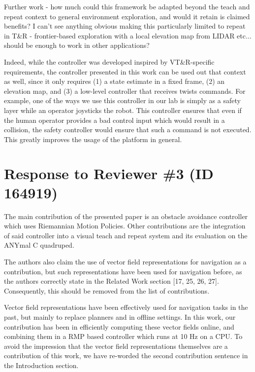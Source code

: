 \documentclass[a4paper,11pt]{article}
\begin{document}
\begin{displayquote}
	Further work - how much could this framework be adapted beyond the
	teach and repeat context to general environment exploration, and would
	it retain is claimed benefits? I can't see anything obvious making this
	particularly limited to repeat in T\&R - frontier-based exploration with
	a local elevation map from LIDAR etc... should be enough to work in
	other applications?
\end{displayquote}

\begin{outline}[enumerate]
	\1 Indeed, while the controller was developed inspired by VT\&R-specific 
	requirements, the controller presented in this work can be used out that 
	context as well, since it only requires (1) a state estimate in a fixed 
	frame, 
	(2) an elevation map, and (3) a low-level controller that receives twists 
	commands.
	\1 For example, one of the ways we use this controller in our lab is simply 
	as a safety layer while an operator joysticks the robot.
	This controller ensures that even if the human operator provides a bad 
	control input which would result in a collision, the safety controller 
	would ensure that such a command is not executed. This greatly improves the 
	usage of the platform in general.
\end{outline}


\pagebreak
\section*{Response to Reviewer \#3 (ID 164919)}

\begin{displayquote}
	The main contribution of the presented paper is an obstacle avoidance
	controller which uses Riemannian Motion Policies. Other contributions
	are the integration of said controller into a visual teach and repeat
	system and its evaluation on the ANYmal C quadruped.

	The authors also claim the use of vector field representations for
	navigation as a contribution, but such representations have been used
	for navigation before, as the authors correctly state in the Related
	Work section [17, 25, 26, 27]. Consequently, this should be removed
	from the list of contributions.
\end{displayquote}


\begin{outline}[enumerate]
	\1 Vector field representations have been effectively used for navigation 
	tasks in the past, but mainly to replace planners and in offline settings.
	\1 In this work, our contribution has been in efficiently computing 
	these vector fields online, and combining them in a RMP based controller 
	which runs at 10 Hz on a CPU.
	\1 To avoid the impression that the vector field representations themselves 
	are a contribution of this work, we have re-worded the second contribution 
	sentence in the Introduction section.
\end{outline}
\end{document}
